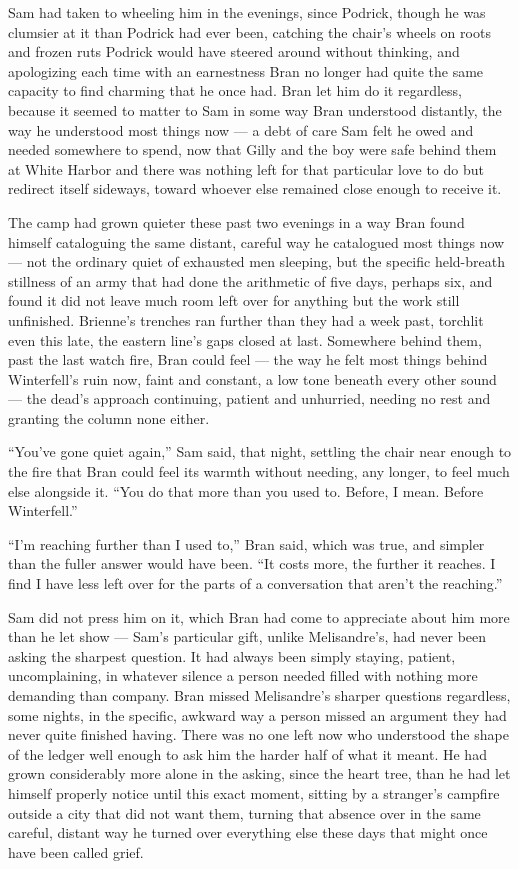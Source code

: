 Sam had taken to wheeling him in the evenings, since Podrick, though he was clumsier at it than Podrick had ever been, catching the chair’s wheels on roots and frozen ruts Podrick would have steered around without thinking, and apologizing each time with an earnestness Bran no longer had quite the same capacity to find charming that he once had. Bran let him do it regardless, because it seemed to matter to Sam in some way Bran understood distantly, the way he understood most things now — a debt of care Sam felt he owed and needed somewhere to spend, now that Gilly and the boy were safe behind them at White Harbor and there was nothing left for that particular love to do but redirect itself sideways, toward whoever else remained close enough to receive it.

The camp had grown quieter these past two evenings in a way Bran found himself cataloguing the same distant, careful way he catalogued most things now — not the ordinary quiet of exhausted men sleeping, but the specific held-breath stillness of an army that had done the arithmetic of five days, perhaps six, and found it did not leave much room left over for anything but the work still unfinished. Brienne’s trenches ran further than they had a week past, torchlit even this late, the eastern line’s gaps closed at last. Somewhere behind them, past the last watch fire, Bran could feel — the way he felt most things behind Winterfell’s ruin now, faint and constant, a low tone beneath every other sound — the dead’s approach continuing, patient and unhurried, needing no rest and granting the column none either.

“You’ve gone quiet again,” Sam said, that night, settling the chair near enough to the fire that Bran could feel its warmth without needing, any longer, to feel much else alongside it. “You do that more than you used to. Before, I mean. Before Winterfell.”

“I’m reaching further than I used to,” Bran said, which was true, and simpler than the fuller answer would have been. “It costs more, the further it reaches. I find I have less left over for the parts of a conversation that aren’t the reaching.”

Sam did not press him on it, which Bran had come to appreciate about him more than he let show — Sam’s particular gift, unlike Melisandre’s, had never been asking the sharpest question. It had always been simply staying, patient, uncomplaining, in whatever silence a person needed filled with nothing more demanding than company. Bran missed Melisandre’s sharper questions regardless, some nights, in the specific, awkward way a person missed an argument they had never quite finished having. There was no one left now who understood the shape of the ledger well enough to ask him the harder half of what it meant. He had grown considerably more alone in the asking, since the heart tree, than he had let himself properly notice until this exact moment, sitting by a stranger’s campfire outside a city that did not want them, turning that absence over in the same careful, distant way he turned over everything else these days that might once have been called grief.

